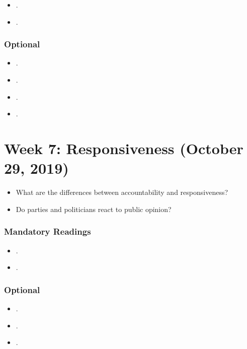 \documentclass[abstract=on,parskip=full,headings=standardclasses,fontsize=11pt,paper=a4]{scrartcl}
\begin{document}
\begin{itemize}
\item {}.
\item {}.
\end{itemize}


\subsubsection*{Optional}
\begin{itemize}
\item {}.
\item {}.
\item {}.
\item {}.
\end{itemize}

 

\section{Week 7:  Responsiveness (October 29, 2019)}



\begin{itemize}
\renewcommand\labelitemi{--}
\item What are the differences between accountability and responsiveness?
\item Do parties and politicians react to public opinion? 
\end{itemize}

\subsubsection*{Mandatory Readings}
\begin{itemize}
\item {}.
\item {}.
\end{itemize}

\subsubsection*{Optional}
\begin{itemize}
\item {}.
\item {}.
\item {}.
\end{itemize}
\end{document}
